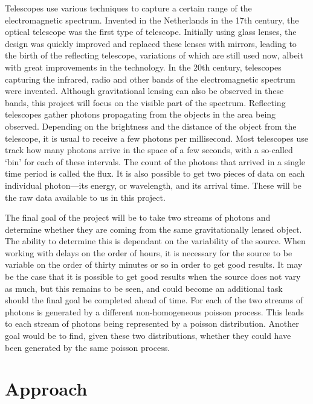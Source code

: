 \documentclass[10pt,a4paper]{article}
\begin{document}
\par Telescopes use various techniques to capture a certain range of the electromagnetic spectrum. Invented in the Netherlands in the 17th century, the optical telescope was the first type of telescope. Initially using glass lenses, the design was quickly improved and replaced these lenses with mirrors, leading to the birth of the reflecting telescope, variations of which are still used now, albeit with great improvements in the technology. In the 20th century, telescopes capturing the infrared, radio and other bands of the electromagnetic spectrum were invented. Although gravitational lensing can also be observed in these bands, this project will focus on the visible part of the spectrum. Reflecting telescopes gather photons propagating from the objects in the area being observed. Depending on the brightness and the distance of the object from the telescope, it is usual to receive a few photons per millisecond. Most telescopes use track how many photons arrive in the space of a few seconds, with a so-called `bin' for each of these intervals. The count of the photons that arrived in a single time period is called the flux. It is also possible to get two pieces of data on each individual photon---its energy, or wavelength, and its arrival time. These will be the raw data available to us in this project.
\par The final goal of the project will be to take two streams of photons and determine whether they are coming from the same gravitationally lensed object. The ability to determine this is dependant on the variability of the source. When working with delays on the order of hours, it is necessary for the source to be variable on the order of thirty minutes or so in order to get good results. It may be the case that it is possible to get good results when the source does not vary as much, but this remains to be seen, and could become an additional task should the final goal be completed ahead of time. For each of the two streams of photons is generated by a different non-homogeneous poisson process. This leads to each stream of photons being represented by a poisson distribution. Another goal would be to find, given these two distributions, whether they could have been generated by the same poisson process.

\section*{Approach}
\end{document}
